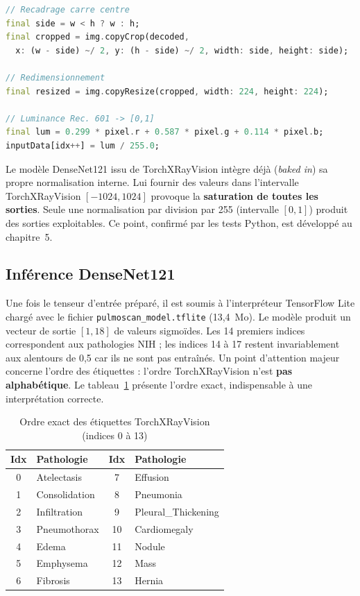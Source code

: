 \documentclass[12pt,a4paper]{report}
\begin{document}
\begin{lstlisting}[language=Dart, caption={Prétraitement de l'image (Dart)}, label={lst:preproc}]
// Recadrage carre centre
final side = w < h ? w : h;
final cropped = img.copyCrop(decoded,
  x: (w - side) ~/ 2, y: (h - side) ~/ 2, width: side, height: side);

// Redimensionnement
final resized = img.copyResize(cropped, width: 224, height: 224);

// Luminance Rec. 601 -> [0,1]
final lum = 0.299 * pixel.r + 0.587 * pixel.g + 0.114 * pixel.b;
inputData[idx++] = lum / 255.0;
\end{lstlisting}

\begin{warnbox}
Le modèle DenseNet121 issu de TorchXRayVision intègre déjà (\emph{baked in}) sa propre normalisation interne. Lui fournir des valeurs dans l'intervalle TorchXRayVision $[-1024, 1024]$ provoque la \textbf{saturation de toutes les sorties}. Seule une normalisation par division par 255 (intervalle $[0,1]$) produit des sorties exploitables. Ce point, confirmé par les tests Python, est développé au chapitre~5.
\end{warnbox}

\subsection{Inférence DenseNet121}
Une fois le tenseur d'entrée préparé, il est soumis à l'interpréteur TensorFlow Lite chargé avec le fichier \texttt{pulmoscan\_model.tflite} (13,4~Mo). Le modèle produit un vecteur de sortie $[1, 18]$ de valeurs sigmoïdes. Les 14 premiers indices correspondent aux pathologies NIH ; les indices 14 à 17 restent invariablement aux alentours de 0,5 car ils ne sont pas entraînés. Un point d'attention majeur concerne l'ordre des étiquettes : l'ordre TorchXRayVision n'est \textbf{pas alphabétique}. Le tableau~\ref{tab:labels} présente l'ordre exact, indispensable à une interprétation correcte.

\begin{table}[H]
\centering
\caption{Ordre exact des étiquettes TorchXRayVision (indices 0 à 13)}
\label{tab:labels}
\begin{tabularx}{\textwidth}{c l c l}
\toprule
\textbf{Idx} & \textbf{Pathologie} & \textbf{Idx} & \textbf{Pathologie} \\
\midrule
0 & Atelectasis & 7 & Effusion \\
1 & Consolidation & 8 & Pneumonia \\
2 & Infiltration & 9 & Pleural\_Thickening \\
3 & Pneumothorax & 10 & Cardiomegaly \\
4 & Edema & 11 & Nodule \\
5 & Emphysema & 12 & Mass \\
6 & Fibrosis & 13 & Hernia \\
\bottomrule
\end{tabularx}
\end{table}
\end{document}
